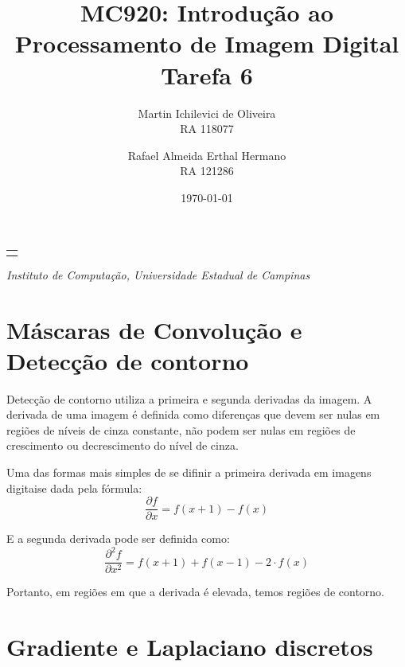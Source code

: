 \documentclass[10pt,a4paper]{article}
\makeatletter
\let\@institution\empty
\def\institution#1{\def\@institution{#1}}
\renewcommand{\maketitle}{
    \begin{center}
        {\Large\bfseries\@title\par\medskip}
        {\large
            \begin{tabular}[t]{c}%
                \@author
        \end{tabular}\par\medskip}
        {\itshape\@institution\par}
        {\itshape\@date\par}
\end{center}}
\makeatother
\begin{document}

\title{MC920: Introdução ao Processamento de Imagem Digital\\Tarefa 6}
\author{
    \begin{minipage}{6cm}
        \centering
        Martin Ichilevici de Oliveira\\
        RA 118077
    \end{minipage}
    \and
    \begin{minipage}{6cm}
        \centering
        Rafael Almeida Erthal Hermano\\
        RA 121286
    \end{minipage}
}
\institution{Instituto de Computação, Universidade Estadual de Campinas}
\date{\today}

\maketitle


\section{Máscaras de Convolução e Detecção de contorno}
Detecção de contorno utiliza a primeira e segunda derivadas da imagem. A derivada de uma imagem é definida como diferenças que devem ser nulas em regiões de níveis de cinza constante, não podem ser nulas em regiões de crescimento ou decrescimento do nível de cinza.

Uma das formas mais simples de se difinir a primeira derivada em imagens digitaise dada pela fórmula:
\begin{equation}
  \frac{\partial f}{\partial x} = f(x + 1) - f(x)
  \label{eq:first_deriv}
\end{equation}

E a segunda derivada pode ser definida como:
\begin{equation}
  \frac{\partial^2 f}{\partial x^2} = f(x + 1) + f(x - 1) - 2 \cdot f(x)
  \label{eq:second_deriv}
\end{equation}

Portanto, em regiões em que a derivada é elevada, temos regiões de contorno.

\section{Gradiente e Laplaciano discretos}
\end{document}
